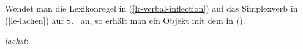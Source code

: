 Wendet man die Lexikonregel in (\ref{lr-verbal-inflection}) auf das Simplexverb
 in (\ref{le-lachen}) auf S.~\pageref{le-lachen} an, so erhält man 
ein Objekt mit dem \synsemw in ().

\eas
\label{le-lachst}
\mbox{\emph{lachst}:}\\
\zs

